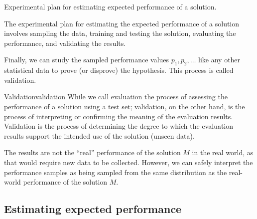 \begin{figurebox}[label=fig:plan-single]{Experimental plan for estimating expected performance of a solution.}
{
  }
  \tcblower
  The experimental plan for estimating the expected performance of a solution involves
  sampling the data, training and testing the solution, evaluating the performance, and
  validating the results.
\end{figurebox}

Finally, we can study the sampled performance values $p_1, p_2, \ldots$ like any other
statistical data to prove (or disprove) the hypothesis.  This process is called
validation.

\begin{defbox}{Validation}{validation}
  While we call evaluation the process of assessing the performance of a solution using a
  test set; validation, on the other hand, is the process of interpreting or confirming
  the meaning of the evaluation results.  Validation is the process of determining the
  degree to which the evaluation results support the intended use of the solution (unseen
  data).
\end{defbox}

The results are not the ``real'' performance of the solution
$M$ in the real world, as that would require new data to be collected.  However, we can
safely interpret the performance samples as being sampled from the same distribution as
the real-world performance of the solution $M$.


\subsection{Estimating expected performance}
\label{sub:expected-performance}

